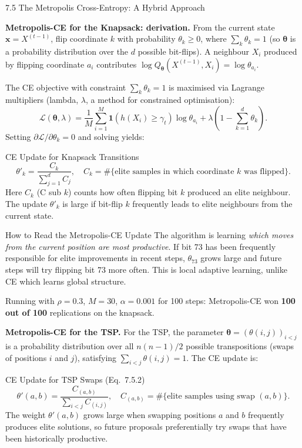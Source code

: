 \documentclass[aspectratio=169,10pt]{beamer}
\newcommand{\bx}{\mathbf{x}}
\begin{document}
\begin{frame}[allowframebreaks]{7.5 The Metropolis Cross-Entropy: A Hybrid Approach}
\framebreak

\textbf{Metropolis-CE for the Knapsack: derivation.}
From the current state $\bx = X^{(t-1)}$, flip coordinate $k$ with
probability $\theta_k \ge 0$, where $\sum_k \theta_k = 1$ (so
$\boldsymbol{\theta}$ is a probability distribution over the $d$ possible
bit-flips).  A neighbour $X_i$ produced by flipping coordinate $a_i$
contributes $\log Q_{\boldsymbol{\theta}}(X^{(t-1)}, X_i) = \log \theta_{a_i}$.

The CE objective with constraint $\sum_k \theta_k = 1$ is maximised via
Lagrange multipliers (lambda, $\lambda$, a method for constrained
optimisation):
\[
  \mathcal{L}(\boldsymbol{\theta}, \lambda) = \frac{1}{M}\sum_{i=1}^M
  \mathbf{1}(h(X_i) \ge \gamma_t)\log \theta_{a_i}
  + \lambda\!\left(1 - \sum_{k=1}^d \theta_k\right).
\]
Setting $\partial\mathcal{L}/\partial\theta_k = 0$ and solving yields:

\begin{block}{CE Update for Knapsack Transitions}
  \[
    \theta'_k = \frac{C_k}{\sum_{j=1}^d C_j},
    \quad
    C_k = \#\{\text{elite samples in which coordinate }k\text{ was flipped}\}.
  \]
  Here $C_k$ (C sub $k$) counts how often flipping bit $k$ produced an
  elite neighbour.  The update $\theta'_k$ is large if bit-flip $k$
  frequently leads to elite neighbours from the current state.
\end{block}

\begin{alertblock}{How to Read the Metropolis-CE Update}
  The algorithm is learning \emph{which moves from the current position are
  most productive}.  If bit 73 has been frequently responsible for elite
  improvements in recent steps, $\theta_{73}$ grows large and future steps
  will try flipping bit 73 more often.  This is local adaptive learning,
  unlike CE which learns global structure.
\end{alertblock}

Running with $\rho=0.3$, $M=30$, $\alpha=0.001$ for 100 steps:
Metropolis-CE won \textbf{100 out of 100} replications on the knapsack.

\framebreak

\textbf{Metropolis-CE for the TSP.}
For the TSP, the parameter $\boldsymbol{\theta} = (\theta(i,j))_{i<j}$ is a
probability distribution over all $n(n-1)/2$ possible transpositions (swaps
of positions $i$ and $j$), satisfying $\sum_{i<j}\theta(i,j) = 1$.  The CE
update is:

\begin{block}{CE Update for TSP Swaps (Eq.~7.5.2)}
  \[
    \theta'(a,b)
    = \frac{C_{(a,b)}}{\displaystyle\sum_{i<j} C_{(i,j)}},
    \quad
    C_{(a,b)} = \#\{\text{elite samples using swap }(a,b)\}.
  \]
  The weight $\theta'(a,b)$ grows large when swapping positions $a$ and $b$
  frequently produces elite solutions, so future proposals preferentially
  try swaps that have been historically productive.
\end{block}


\end{frame}
\end{document}
